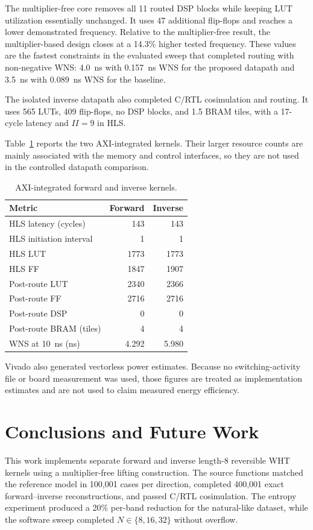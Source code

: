 \documentclass[conference]{IEEEtran}
\begin{document}
The multiplier-free core removes all 11 routed DSP blocks while keeping LUT
utilization essentially unchanged. It uses 47 additional flip-flops and reaches
a lower demonstrated frequency. Relative to the multiplier-free result, the
multiplier-based design closes at a 14.3\% higher tested frequency. These values
are the fastest constraints in the evaluated sweep that completed routing with
non-negative WNS: 4.0~ns with 0.157~ns WNS for the proposed datapath and 3.5~ns
with 0.089~ns WNS for the baseline.

The isolated inverse datapath also completed C/RTL cosimulation and routing. It
uses 565 LUTs, 409 flip-flops, no DSP blocks, and 1.5 BRAM tiles, with a
17-cycle latency and $II=9$ in HLS.

Table~\ref{tab:axi} reports the two AXI-integrated kernels. Their larger resource
counts are mainly associated with the memory and control interfaces, so they are
not used in the controlled datapath comparison.

\begin{table}[htbp]
\caption{AXI-integrated forward and inverse kernels.}
\label{tab:axi}
\centering
\begin{tabular}{@{}lrr@{}}
\hline
\textbf{Metric} & \textbf{Forward} & \textbf{Inverse} \\
\hline
HLS latency (cycles) & 143 & 143 \\
HLS initiation interval & 1 & 1 \\
HLS LUT & 1773 & 1773 \\
HLS FF & 1847 & 1907 \\
Post-route LUT & 2340 & 2366 \\
Post-route FF & 2716 & 2716 \\
Post-route DSP & 0 & 0 \\
Post-route BRAM (tiles) & 4 & 4 \\
WNS at 10~ns (ns) & 4.292 & 5.980 \\
\hline
\end{tabular}
\end{table}

Vivado also generated vectorless power estimates. Because no switching-activity
file or board measurement was used, those figures are treated as implementation
estimates and are not used to claim measured energy efficiency.

\section{Conclusions and Future Work}
This work implements separate forward and inverse length-8 reversible WHT
kernels using a multiplier-free lifting construction. The source functions
matched the reference model in 100,001 cases per direction, completed 400,001
exact forward--inverse reconstructions, and passed C/RTL cosimulation. The
entropy experiment produced a 20\% per-band reduction for the natural-like
dataset, while the software sweep completed $N\in\{8,16,32\}$ without overflow.
\end{document}

